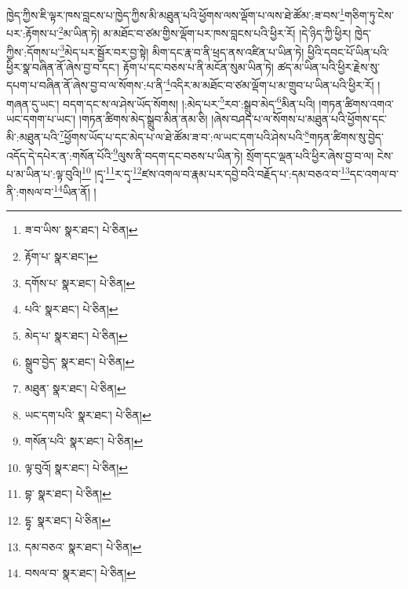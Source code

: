 ཁྱེད་ཀྱིས་ཇི་ལྟར་ཁས་བླངས་པ་ཁྱེད་ཀྱིས་མི་མཐུན་པའི་ཕྱོགས་ལས་ལྡོག་པ་ལས་ཐེ་ཚོམ་:ཟ་བས་\footnote{ཟ་བ་ཡིས་  སྣར་ཐང་།  པེ་ཅིན། }གཅིག་ཏུ་ངེས་པར་:རྟོགས་པ་\footnote{རྟོག་པ་  སྣར་ཐང་། }མ་ཡིན་ཏེ། མ་མཐོང་བ་ཙམ་གྱིས་ལྡོག་པར་ཁས་བླངས་པའི་ཕྱིར་རོ། །དེ་ཉིད་ཀྱི་ཕྱིར། ཁྱེད་ཀྱིས་:དོགས་པ་\footnote{དགོས་པ་  སྣར་ཐང་།  པེ་ཅིན། }མེད་པར་སྦྱོར་བར་བྱ་སྟེ། མིག་དང་རྣ་བ་ནི་ཕྲད་ནས་འཛིན་པ་ཡིན་ཏེ། ཕྱིའི་དབང་པོ་ཡིན་པའི་ཕྱིར་སྣ་བཞིན་ནོ་ཞེས་བྱ་བ་དང་། རྟོག་པ་དང་བཅས་པ་ནི་མངོན་སུམ་ཡིན་ཏེ། ཚད་མ་ཡིན་པའི་ཕྱིར་རྗེས་སུ་དཔག་པ་བཞིན་ནོ་ཞེས་བྱ་བ་ལ་སོགས་:པ་ནི་\footnote{པའི་  སྣར་ཐང་།  པེ་ཅིན། }འདིར་མ་མཐོང་བ་ཙམ་ལྡོག་པ་མ་གྲུབ་པ་ཡིན་པའི་ཕྱིར་རོ། །གཞན་དུ་ཡང་། བདག་དང་ས་ལ་ཤེས་ཡོད་སོགས། །:མེད་པར་\footnote{མེད་པ་  སྣར་ཐང་།  པེ་ཅིན། }རབ་:སྒྲུབ་མེད་\footnote{སྒྲུབ་བྱེད་  སྣར་ཐང་།  པེ་ཅིན། }མིན་པའི། །གཏན་ཚིགས་འགའ་ཡང་དགག་པ་ཡང་། །གཏན་ཚིགས་མེད་སྒྲུབ་མིན་ནམ་ཅི། །ཞེས་བཤད་པ་ལ་སོགས་པ་མཐུན་པའི་ཕྱོགས་དང་མི་:མཐུན་པའི་\footnote{མཐུན་  སྣར་ཐང་།  པེ་ཅིན། }ཕྱོགས་ཡོད་པ་དང་མེད་པ་ལ་ཐེ་ཚོམ་ཟ་བ་:ལ་ཡང་དག་པའི་ཤེས་པའི་\footnote{ཡང་དག་པའི་  སྣར་ཐང་།  པེ་ཅིན། }གཏན་ཚིགས་སུ་བྱེད་འདོད་དེ་དཔེར་ན་:གསོན་པོའི་\footnote{གསོན་པའི་  སྣར་ཐང་།  པེ་ཅིན། }ལུས་ནི་བདག་དང་བཅས་པ་ཡིན་ཏེ། སྲོག་དང་ལྡན་པའི་ཕྱིར་ཞེས་བྱ་བ་ལ། ངེས་པ་མ་ཡིན་པ་:ལྟ་བུའི།\footnote{ལྟ་བུའོ།  སྣར་ཐང་།  པེ་ཅིན། } །དྭ་\footnote{བྷ་  སྣར་ཐང་།  པེ་ཅིན། }ར་དྭ་\footnote{དྷྭ་  སྣར་ཐང་།  པེ་ཅིན། }ཛས་འགལ་བ་རྣམ་པར་དབྱེ་བའི་བརྗོད་པ་:དམ་བཅའ་བ་\footnote{དམ་བཅའ་  སྣར་ཐང་།  པེ་ཅིན། }དང་འགལ་བ་ནི་:གསལ་བ་\footnote{བསལ་བ་  སྣར་ཐང་།  པེ་ཅིན། }ཡིན་ནོ། །

